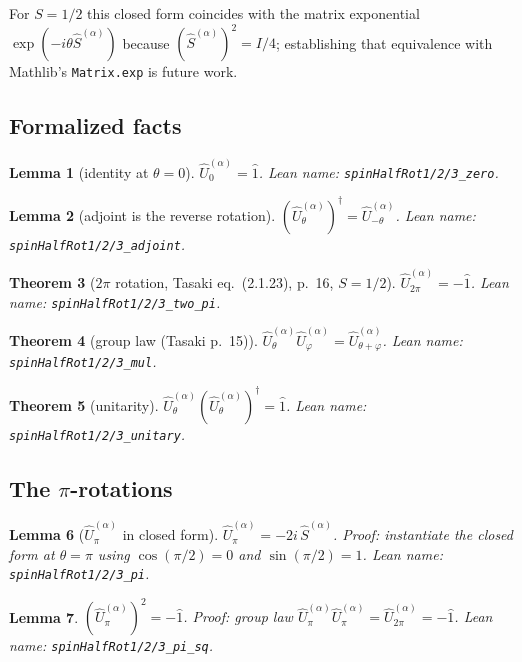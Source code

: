 \documentclass[a4paper,11pt]{article}
\newtheorem{theorem}{Theorem}
\newtheorem{lemma}[theorem]{Lemma}
\begin{document}
For $S = 1/2$ this closed form coincides with the matrix exponential
$\exp(-i\theta\hat S^{(\alpha)})$ because $(\hat S^{(\alpha)})^2 = I/4$;
establishing that equivalence with Mathlib's \texttt{Matrix.exp} is
future work.

\subsection{Formalized facts}

\begin{lemma}[identity at $\theta = 0$]
$\hat U^{(\alpha)}_0 = \hat 1$. Lean name:
\texttt{spinHalfRot1/2/3\_zero}.
\end{lemma}

\begin{lemma}[adjoint is the reverse rotation]
$(\hat U^{(\alpha)}_\theta)^\dagger = \hat U^{(\alpha)}_{-\theta}$.
Lean name: \texttt{spinHalfRot1/2/3\_adjoint}.
\end{lemma}

\begin{theorem}[$2\pi$ rotation, Tasaki eq.~(2.1.23), p.~16, $S = 1/2$]
$\hat U^{(\alpha)}_{2\pi} = -\hat 1$. Lean name:
\texttt{spinHalfRot1/2/3\_two\_pi}.
\end{theorem}

\begin{theorem}[group law (Tasaki p.~15)]
$\hat U^{(\alpha)}_\theta \hat U^{(\alpha)}_\varphi
  = \hat U^{(\alpha)}_{\theta + \varphi}$.
Lean name: \texttt{spinHalfRot1/2/3\_mul}.
\end{theorem}

\begin{theorem}[unitarity]
$\hat U^{(\alpha)}_\theta (\hat U^{(\alpha)}_\theta)^\dagger = \hat 1$.
Lean name: \texttt{spinHalfRot1/2/3\_unitary}.
\end{theorem}

\subsection{The $\pi$-rotations}

\begin{lemma}[$\hat U^{(\alpha)}_\pi$ in closed form]
$\hat U^{(\alpha)}_\pi = -2i\,\hat S^{(\alpha)}$. Proof: instantiate the
closed form at $\theta = \pi$ using $\cos(\pi/2) = 0$ and
$\sin(\pi/2) = 1$. Lean name: \texttt{spinHalfRot1/2/3\_pi}.
\end{lemma}

\begin{lemma}
$(\hat U^{(\alpha)}_\pi)^2 = -\hat 1$. Proof: group law
$\hat U^{(\alpha)}_\pi \hat U^{(\alpha)}_\pi = \hat U^{(\alpha)}_{2\pi}
= -\hat 1$. Lean name: \texttt{spinHalfRot1/2/3\_pi\_sq}.
\end{lemma}
\end{document}

